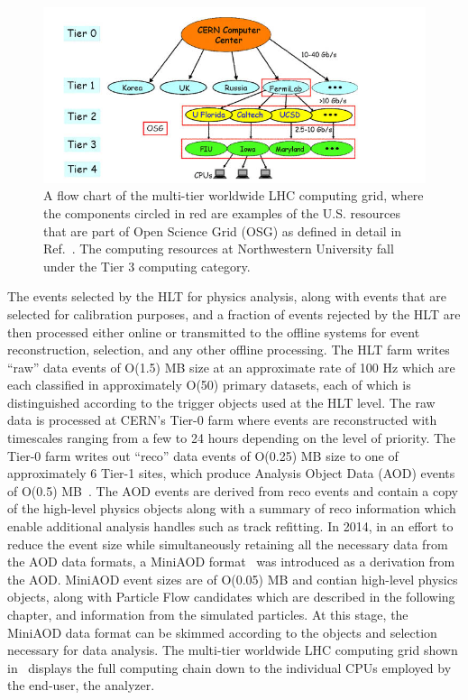 \begin{figure}
  \centering
  \includegraphics[width=\textwidth]{figs/computing}
  \caption{A flow chart of the multi-tier worldwide LHC computing grid, where the components circled in red are examples of the U.S. resources that are part of Open Science Grid (OSG) as defined in detail in Ref.~\cite{FM1866}. The computing resources at Northwestern University fall under the Tier 3 computing category.}
\label{fig:computing}
\end{figure}

The events selected by the HLT for physics analysis, along with events that are selected for calibration purposes, and a fraction of events rejected by the HLT are then processed either online or transmitted to the offline systems for event reconstruction, selection, and any other offline processing. The HLT farm writes ``raw'' data events of O(1.5) MB size at an approximate rate of 100 Hz which are each classified in approximately O(50) primary datasets, each of which is distinguished according to the trigger objects used at the HLT level. The raw data is processed at CERN's Tier-0 farm where events are reconstructed with timescales ranging from a few to 24 hours depending on the level of priority. The Tier-0 farm writes out ``reco'' data events of O(0.25) MB size to one of approximately 6 Tier-1 sites, which produce Analysis Object Data (AOD) events of O(0.5) MB~\cite{Eck:840543}. The AOD events are derived from reco events and contain a copy of the high-level physics objects along with a summary of reco information which enable additional analysis handles such as track refitting. In 2014, in an effort to reduce the event size while simultaneously retaining all the necessary data from the AOD data formats, a MiniAOD format~\cite{1742-6596-664-7-072052} was introduced as a derivation from the AOD. MiniAOD event sizes are of O(0.05) MB and contian high-level physics objects, along with Particle Flow candidates which are described in the following chapter, and information from the simulated particles. At this stage, the MiniAOD data format can be skimmed according to the objects and selection necessary for data analysis. The multi-tier worldwide LHC computing grid shown in~ displays the full computing chain down to the individual CPUs employed by the end-user, the analyzer.
